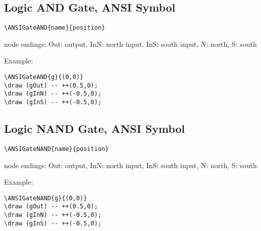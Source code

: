 \documentclass[parskip=full]{scrartcl}
\begin{document}
\subsection{Logic AND Gate, ANSI Symbol}

\begin{verbatim}
\ANSIGateAND{name}{position}
\end{verbatim}
node endings: Out: output,
              InN: north input, InS: south input,
              N: north, S: south

Example:\\
\begin{minipage}{0.8\textwidth}
\begin{verbatim}
\ANSIGateAND{g}{(0,0)}
\draw (gOut) -- ++(0.5,0);
\draw (gInN) -- ++(-0.5,0);
\draw (gInS) -- ++(-0.5,0);
\end{verbatim}
\end{minipage}
\begin{minipage}{0.19\textwidth}
\end{minipage}

\subsection{Logic NAND Gate, ANSI Symbol}

\begin{verbatim}
\ANSIGateNAND{name}{position}
\end{verbatim}
node endings: Out: output,
              InN: north input, InS: south input,
              N: north, S: south

Example:\\
\begin{minipage}{0.8\textwidth}
\begin{verbatim}
\ANSIGateNAND{g}{(0,0)}
\draw (gOut) -- ++(0.5,0);
\draw (gInN) -- ++(-0.5,0);
\draw (gInS) -- ++(-0.5,0);
\end{verbatim}
\end{minipage}
\begin{minipage}{0.19\textwidth}
\end{minipage}
\end{document}
